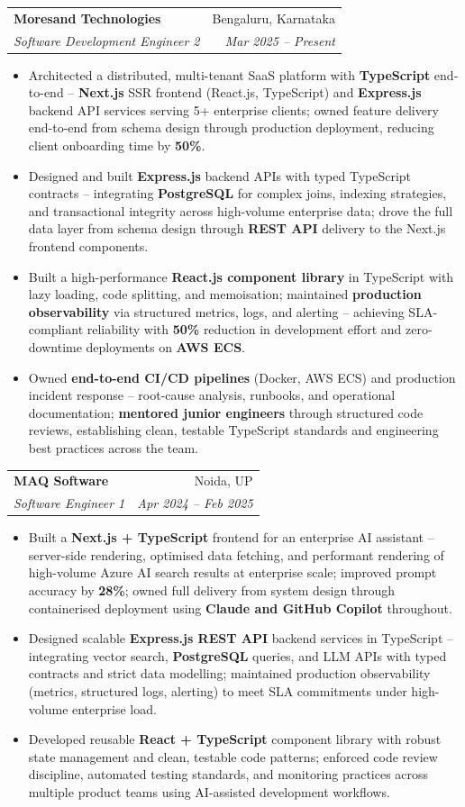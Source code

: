 \documentclass[a4paper,20pt]{article}
\makeatletter
\newcommand{\resumeSubheading}[4]{\vspace{-1pt}\item\begin{tabular*}{0.97\textwidth}{l@{\extracolsep{\fill}}r}\textbf{#1} & #2 \\\textit{#3} & \textit{#4} \\\end{tabular*}\vspace{-5pt}}
\newcommand{\resumeItemListStart}{\begin{itemize}}
\newcommand{\resumeItemListEnd}{\end{itemize}\vspace{-5pt}}
\makeatother
\begin{document}
    \resumeSubheading
      {Moresand Technologies}{Bengaluru, Karnataka}
      {Software Development Engineer 2}{Mar 2025 -- Present}
      \resumeItemListStart
        \item\small{Architected a distributed, multi-tenant SaaS platform with \textbf{TypeScript} end-to-end -- \textbf{Next.js} SSR frontend (React.js, TypeScript) and \textbf{Express.js} backend API services serving 5+ enterprise clients; owned feature delivery end-to-end from schema design through production deployment, reducing client onboarding time by \textbf{50\%}.}
        \item\small{Designed and built \textbf{Express.js} backend APIs with typed TypeScript contracts -- integrating \textbf{PostgreSQL} for complex joins, indexing strategies, and transactional integrity across high-volume enterprise data; drove the full data layer from schema design through \textbf{REST API} delivery to the Next.js frontend components.}
        \item\small{Built a high-performance \textbf{React.js component library} in TypeScript with lazy loading, code splitting, and memoisation; maintained \textbf{production observability} via structured metrics, logs, and alerting -- achieving SLA-compliant reliability with \textbf{50\%} reduction in development effort and zero-downtime deployments on \textbf{AWS ECS}.}
        \item\small{Owned \textbf{end-to-end CI/CD pipelines} (Docker, AWS ECS) and production incident response -- root-cause analysis, runbooks, and operational documentation; \textbf{mentored junior engineers} through structured code reviews, establishing clean, testable TypeScript standards and engineering best practices across the team.}
      \resumeItemListEnd

    \resumeSubheading
      {MAQ Software}{Noida, UP}
      {Software Engineer 1}{Apr 2024 -- Feb 2025}
      \resumeItemListStart
        \item\small{Built a \textbf{Next.js + TypeScript} frontend for an enterprise AI assistant -- server-side rendering, optimised data fetching, and performant rendering of high-volume Azure AI search results at enterprise scale; improved prompt accuracy by \textbf{28\%}; owned full delivery from system design through containerised deployment using \textbf{Claude and GitHub Copilot} throughout.}
        \item\small{Designed scalable \textbf{Express.js REST API} backend services in TypeScript -- integrating vector search, \textbf{PostgreSQL} queries, and LLM APIs with typed contracts and strict data modelling; maintained production observability (metrics, structured logs, alerting) to meet SLA commitments under high-volume enterprise load.}
        \item\small{Developed reusable \textbf{React + TypeScript} component library with robust state management and clean, testable code patterns; enforced code review discipline, automated testing standards, and monitoring practices across multiple product teams using AI-assisted development workflows.}
      \resumeItemListEnd
\end{document}
